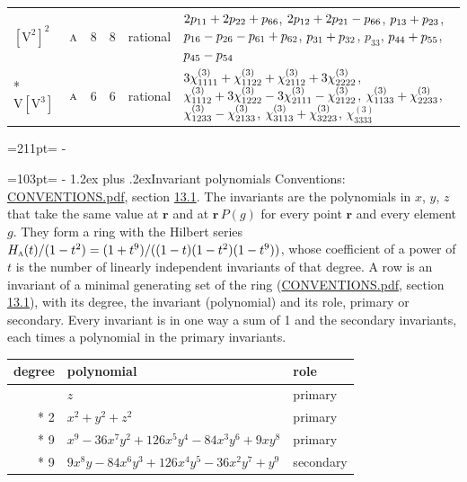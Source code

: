 \documentclass[10pt,a4paper]{article}
\makeatletter
\renewcommand\section{\@startsection{section}{1}{\z@}{-3ex plus -1ex minus -.2ex}%
  {1.2ex plus .2ex}{\normalfont\large\sffamily\bfseries\color{parttitle}}}
\newcommand{\needspace}[1]{\par\penalty-100\begingroup\dimen0=#1\relax\dimen2=\pagegoal
  \advance\dimen2-\pagetotal\ifdim\dimen0>\dimen2\relax\ifdim\dimen2>0pt\vfil\break\fi\fi
  \endgroup}
\numberwithin{equation}{section}
\newcommand{\irr}[1]{\text{\normalfont\scshape #1}}
\newcommand{\pointr}{\mathbf{r}}
\newcommand{\jahn}[1]{\mathrm{#1}}
\newlength{\fillwidth}\newlength{\cellwidth}\newlength{\colwidth}
\newcommand{\signbreak}{\penalty100\relax}
\makeatother
\begin{document}
{\begin{longtable}{@{}llrrl>{\RaggedRight\arraybackslash}p{\fillwidth}@{}}
$\jahn{[V^{2}]^{2}}$ & $\irr{a}$ & 8 & 8 & rational & $2p_{11} +\signbreak 2p_{22} +\signbreak p_{66}$, $2p_{12} +\signbreak 2p_{21} -\signbreak p_{66}$, $p_{13} +\signbreak p_{23}$, $p_{16} -\signbreak p_{26} -\signbreak p_{61} +\signbreak p_{62}$, $p_{31} +\signbreak p_{32}$, $p_{33}$, $p_{44} +\signbreak p_{55}$, $p_{45} -\signbreak p_{54}$\\*
$\jahn{V[V^{3}]}$ & $\irr{a}$ & 6 & 6 & rational & $3\chi^{(3)}_{1111} +\signbreak \chi^{(3)}_{1122} +\signbreak \chi^{(3)}_{2112} +\signbreak 3\chi^{(3)}_{2222}$, $\chi^{(3)}_{1112} +\signbreak 3\chi^{(3)}_{1222} -\signbreak 3\chi^{(3)}_{2111} -\signbreak \chi^{(3)}_{2122}$, $\chi^{(3)}_{1133} +\signbreak \chi^{(3)}_{2233}$, $\chi^{(3)}_{1233} -\signbreak \chi^{(3)}_{2133}$, $\chi^{(3)}_{3113} +\signbreak \chi^{(3)}_{3223}$, $\chi^{(3)}_{3333}$\\
\bottomrule\end{longtable}}
\needspace{211pt}
\needspace{103pt}
\section{Invariant polynomials}\label{s:invariant_polynomials}
Conventions: \href{../../CONVENTIONS.pdf}{CONVENTIONS.pdf}, section \href{../../CONVENTIONS.pdf\#conv.13.1}{13.1}.
The invariants are the polynomials in $x$, $y$, $z$ that take the same value at $\pointr$ and at $\pointr\,P(g)$ for every point $\pointr$ and every element $g$. They form a ring with the Hilbert series $H_{\irr{a}}(t)/(1-t^{2}) = (1 + t^{9})/((1-t)(1-t^{2})(1-t^{9}))$, whose coefficient of a power of $t$ is the number of linearly independent invariants of that degree. \label{n:head.degree}\label{n:head.role}A row is an invariant of a minimal generating set of the ring (\href{../../CONVENTIONS.pdf}{CONVENTIONS.pdf}, section \href{../../CONVENTIONS.pdf\#conv.13.1}{13.1}), with its degree, the invariant (polynomial) and its role, primary or secondary. Every invariant is in one way a sum of 1 and the secondary invariants, each times a polynomial in the primary invariants.
{\small\begin{longtable}{@{}rll@{}}\toprule
degree & polynomial & role\\\midrule\endhead
\bottomrule\endfoot\endlastfoot
1 & $z$ & primary\\*
2 & $x^{2} + y^{2} + z^{2}$ & primary\\*
9 & $x^{9} - 36x^{7}y^{2} + 126x^{5}y^{4} - 84x^{3}y^{6} + 9xy^{8}$ & primary\\*
9 & $9x^{8}y - 84x^{6}y^{3} + 126x^{4}y^{5} - 36x^{2}y^{7} + y^{9}$ & secondary\\
\bottomrule\end{longtable}}
\end{document}
